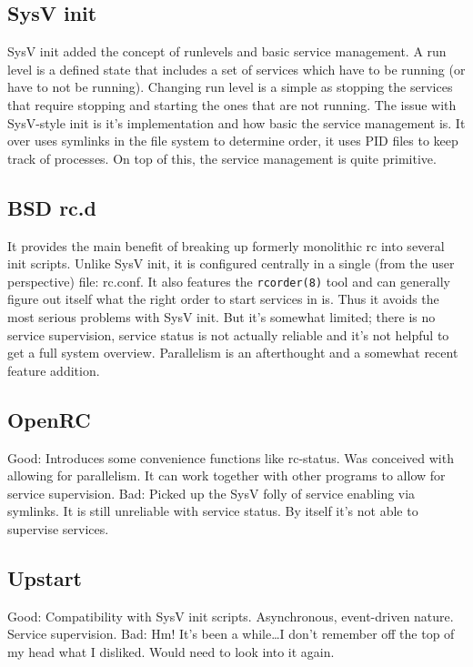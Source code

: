 \documentclass{article}
\begin{document}
\subsection{SysV init}
SysV init added the concept of runlevels and basic 
service management. A run level is a defined state that includes
a set of services which have to be running (or have to not be running). Changing run level
is a simple as stopping the services that require stopping and starting the ones
that are not running. The issue with SysV-style init is it's implementation and
how basic the service management is. It over uses symlinks in the file system to determine order,
it uses PID files to keep track of processes. On top of this, the service management is
quite primitive.

\subsection{BSD rc.d}
It provides the main benefit of breaking up formerly monolithic rc into several
init scripts. Unlike SysV init, it is configured centrally in a single (from the user
perspective) file: rc.conf. It also features the \texttt{rcorder(8)} tool and can generally
figure out itself what the right order to start services in is. Thus it avoids the most
serious problems with SysV init. But it's somewhat limited;
there is no service supervision, service status is not actually reliable and it's not helpful
to get a full system overview. Parallelism is an afterthought and a somewhat recent feature
addition.

\subsection{OpenRC}
Good: Introduces some convenience functions like rc-status. Was conceived with allowing
for parallelism. It can work together with other programs to allow for service supervision.
Bad: Picked up the SysV folly of service enabling via symlinks. It is still unreliable with
service status. By itself it's not able to supervise services.

\subsection{Upstart}
Good: Compatibility with SysV init scripts. Asynchronous, event-driven nature. Service
supervision. Bad: Hm! It's been a while\dots I don't remember off the top of my head what I
disliked. Would need to look into it again.
\end{document}
